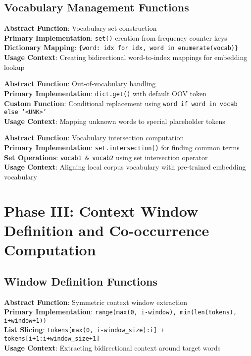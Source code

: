 \documentclass[11pt,a4paper]{article}
\begin{document}
\subsection{Vocabulary Management Functions}

\textbf{Abstract Function}: Vocabulary set construction \\
\textbf{Primary Implementation}: \texttt{set()} creation from frequency counter keys \\
\textbf{Dictionary Mapping}: \texttt{\{word: idx for idx, word in enumerate(vocab)\}} \\
\textbf{Usage Context}: Creating bidirectional word-to-index mappings for embedding lookup

\textbf{Abstract Function}: Out-of-vocabulary handling \\
\textbf{Primary Implementation}: \texttt{dict.get()} with default OOV token \\
\textbf{Custom Function}: Conditional replacement using \texttt{word if word in vocab else '<UNK>'} \\
\textbf{Usage Context}: Mapping unknown words to special placeholder tokens

\textbf{Abstract Function}: Vocabulary intersection computation \\
\textbf{Primary Implementation}: \texttt{set.intersection()} for finding common terms \\
\textbf{Set Operations}: \texttt{vocab1 \& vocab2} using set intersection operator \\
\textbf{Usage Context}: Aligning local corpus vocabulary with pre-trained embedding vocabulary

\section{Phase III: Context Window Definition and Co-occurrence Computation}

\subsection{Window Definition Functions}

\textbf{Abstract Function}: Symmetric context window extraction \\
\textbf{Primary Implementation}: \texttt{range(max(0, i-window), min(len(tokens), i+window+1))} \\
\textbf{List Slicing}: \texttt{tokens[max(0, i-window\_size):i] + tokens[i+1:i+window\_size+1]} \\
\textbf{Usage Context}: Extracting bidirectional context around target words
\end{document}
